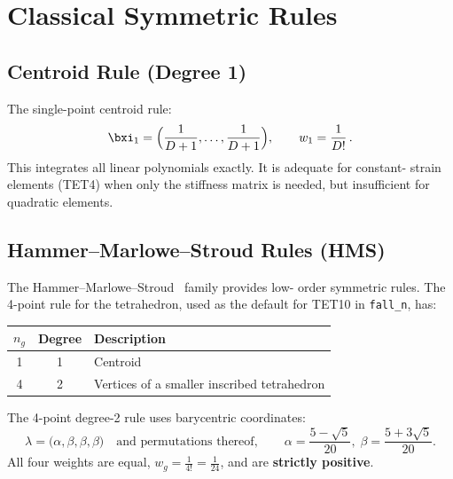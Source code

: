 \section{Classical Symmetric Rules}
\label{sec:classical_rules}

\subsection{Centroid Rule (Degree 1)}

The single-point centroid rule:
\begin{equation}
  \bxi_1 = \Bigl(\frac{1}{D+1}, \dots, \frac{1}{D+1}\Bigr),
  \qquad w_1 = \frac{1}{D!}\,.
  \label{eq:centroid_rule}
\end{equation}
This integrates all linear polynomials exactly.  It is adequate for constant-
strain elements (TET4) when only the stiffness matrix is needed, but
insufficient for quadratic elements.

\subsection{Hammer--Marlowe--Stroud Rules (HMS)}
\label{sec:HMS}

The Hammer--Marlowe--Stroud~\cite{HammerMarloweStroud1956} family provides low-
order symmetric rules.  The 4-point rule for the tetrahedron, used as the
default for TET10 in \texttt{fall\_n}, has:

\begin{center}
\begin{tabular}{ccl}
  \toprule
  $n_g$ & Degree & Description \\
  \midrule
  1     & 1      & Centroid \\
  4     & 2      & Vertices of a smaller inscribed tetrahedron \\
  \bottomrule
\end{tabular}
\end{center}

The 4-point degree-2 rule uses barycentric coordinates:
\begin{equation}
  \lambda = \bigl(\alpha, \beta, \beta, \beta\bigr)
  \quad\text{and permutations thereof},
  \qquad
  \alpha = \frac{5 - \sqrt{5}}{20},\;
  \beta  = \frac{5 + 3\sqrt{5}}{20}.
\end{equation}
All four weights are equal, $w_g = \frac{1}{4!} = \frac{1}{24}$, and are
\textbf{strictly positive}.

